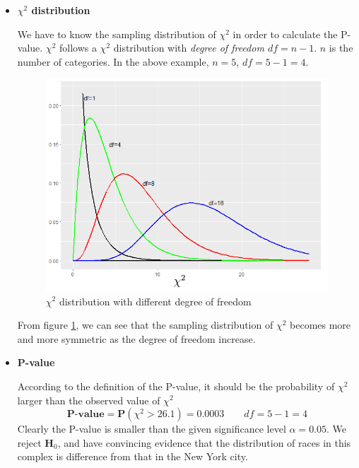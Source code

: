 \documentclass[a4paper, 12pt,twoside]{book}
\begin{document}
\begin{itemize}
Now let's plug in the values and calculate $\chi^2$
$$\chi^2 = \frac{(212-224)^2}{224}+\frac{(202-192)^2}{192}+
\frac{(270-280)^2}{280}+\frac{(94-96)^2}{96}+\frac{(22-8)^2}{8}= 26.1$$

\begin{textblock}{3}(15.5, -2)
Is a larger $\chi^2$ or a smaller $\chi^2$ in favour of $\textbf{H}_a$?
\end{textblock}
\item \textbf{$\chi^2$ distribution}\vspace{0.3cm}

We have to know the sampling distribution of $\chi^2$ in order to calculate the P-value. $\chi^2$ follows a $\chi^2$ distribution with \textit{degree of freedom $df=n-1$}. $n$ is the number of categories.  In the above example, $n = 5$, $df = 5-1=4$. 
    \begin{figure}[H]
    \centering
    \includegraphics[scale=0.6]{Chi-squareDistribution}
    \caption{$\chi^2$ distribution with different degree of freedom}
    \label{Chi-squareDistribution}
    \end{figure}
From figure \ref{Chi-squareDistribution}, we can see that the sampling distribution of $\chi^2$ becomes more and more symmetric as the degree of freedom increase.

\item \textbf{P-value}\vspace{0.3cm}

According to the definition of the P-value, it should be the probability of $\chi^2$ larger than the observed value of $\chi^2$
$$\textbf{P-value}=\textbf{P}(\chi^2 > 26.1) = 0.0003 \qquad df = 5-1 =4$$
Clearly the P-value is smaller than the given significance level $\alpha = 0.05$. We reject $\textbf{H}_0$, and have convincing evidence that the distribution of races in this complex is difference from that in the New York city.\vspace{0.3cm}


\end{itemize}
\end{document}
